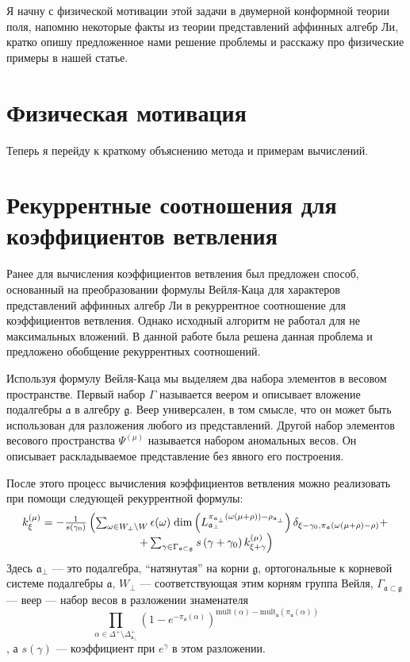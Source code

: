 Я начну с физической мотивации этой задачи в двумерной конформной теории поля, напомню некоторые
факты из теории представлений аффинных алгебр Ли, кратко опишу предложенное нами решение проблемы и
расскажу про физические примеры в нашей статье.

\section{Физическая мотивация}
\label{sec:physics}


Теперь я перейду к краткому объяснению метода и примерам вычислений.

\section{Рекуррентные соотношения для коэффициентов ветвления}
\label{sec:branching}

Ранее для вычисления коэффициентов ветвления был предложен способ, основанный на преобразовании
формулы Вейля-Каца для характеров представлений аффинных алгебр Ли в рекуррентное соотношение для
коэффициентов ветвления. Однако исходный алгоритм не работал для не максимальных вложений. В данной
работе была решена данная проблема и предложено обобщение рекуррентных соотношений. 

Используя формулу Вейля-Каца мы выделяем два набора элементов в весовом пространстве. Первый набор $\Gamma$
называется веером и описывает вложение подалгебры $\mathfrak{a}$ в алгебру $\mathfrak{g}$. Веер
универсален, в том смысле, что он может быть использован для разложения любого из представлений.
Другой набор элементов весового пространства $\Psi ^{\left( \mu \right) }$ называется набором
аномальных весов. Он описывает раскладываемое представление без явного его построения. 

После этого процесс вычисления коэффициентов ветвления можно реализовать при помощи следующей
рекуррентной формулы:
\begin{equation}
  \label{eq:1}
  \begin{array}{c}
      k_{\xi }^{\left( \mu \right) }=-\frac{1}{s\left( \gamma _{0}\right) }\left(
  \sum_{\omega\in W_{\bot}\backslash W} \epsilon(\omega)\; {\rm dim}\left(L^{\pi_{\mathfrak{a}_{\bot}}(\omega(\mu+\rho))-\rho_{\mathfrak{a}_{\bot}}}_{\mathfrak{a}_{\bot}}\right) \delta_{\xi-\gamma_0,\pi_{\mathfrak{a}}(\omega(\mu+\rho)-\rho)}+ \right.\\
\left.
+\sum_{\gamma \in
\Gamma _{\frak{a}\subset \frak{g}}}s\left( \gamma +\gamma _{0}\right) k_{\xi
+\gamma }^{\left( \mu \right) }\right)

  \end{array}
\end{equation}
Здесь $\mathfrak{a}_{\bot}$ --- это подалгебра, ``натянутая'' на корни $\mathfrak{g}$, ортогональные
к корневой системе подалгебры  $\mathfrak{a}$, $W_{\bot}$ --- соответствующая этим корням группа Вейля,
$\Gamma_{\mathfrak{a}\subset \mathfrak{g}}$ --- веер --- набор весов в разложении знаменателя $$\prod_{\alpha\in \Delta^{+}\setminus \Delta^{+}_{\mathfrak{a}_{\bot}}}
(1-e^{-\pi_{\mathfrak{a}}(\alpha)})^{\mathrm{mult}(\alpha)-\mathrm{mult}_{\mathfrak{a}}(\pi_{\mathfrak{a}}(\alpha))}$$, а $s(\gamma)$ ---
коэффициент при  $e^{\gamma}$ в этом разложении.


